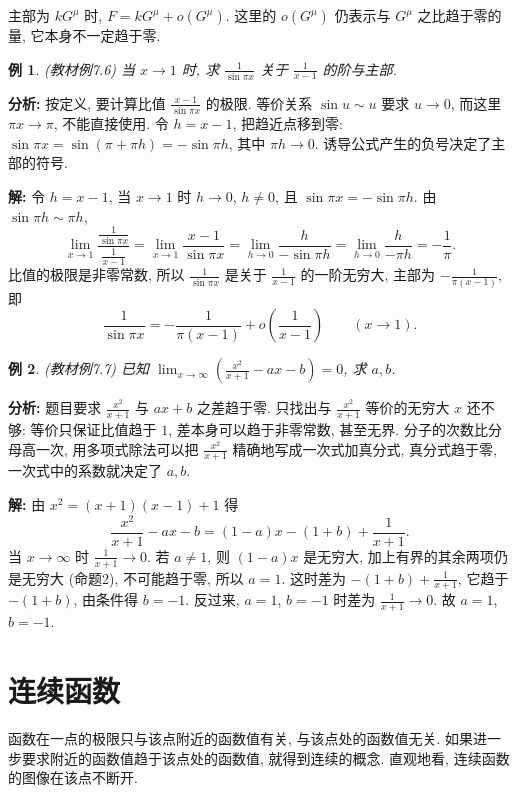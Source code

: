 \documentclass[UTF8,openany]{ctexbook}
\theoremstyle{chinesetextbook}
\newtheorem{example}{例}[section]
\newenvironment{cnsolution}{\par\indent\textbf{解:} \ignorespaces}{\par}
\begin{document}
主部为 $kG^\mu$ 时, $F=kG^\mu+o(G^\mu)$. 这里的 $o(G^\mu)$ 仍表示与 $G^\mu$ 之比趋于零的量, 它本身不一定趋于零.
\begin{example}\label{ex:7-6}
\textnormal{(教材例7.6)} 当 $x\to1$ 时, 求 $\displaystyle\frac1{\sin\pi x}$ 关于 $\displaystyle\frac1{x-1}$ 的阶与主部.
\end{example}
\par\indent\textbf{分析:} 按定义, 要计算比值 $\displaystyle\frac{x-1}{\sin\pi x}$ 的极限. 等价关系 $\sin u\sim u$ 要求 $u\to0$, 而这里 $\pi x\to\pi$, 不能直接使用. 令 $h=x-1$, 把趋近点移到零: $\sin\pi x=\sin(\pi+\pi h)=-\sin\pi h$, 其中 $\pi h\to0$. 诱导公式产生的负号决定了主部的符号.
\begin{cnsolution}
令 $h=x-1$, 当 $x\to1$ 时 $h\to0$, $h\ne0$, 且 $\sin\pi x=-\sin\pi h$. 由 $\sin\pi h\sim\pi h$,
\[
\lim_{x\to1}\frac{\frac1{\sin\pi x}}{\frac1{x-1}}=\lim_{x\to1}\frac{x-1}{\sin\pi x}=\lim_{h\to0}\frac h{-\sin\pi h}=\lim_{h\to0}\frac h{-\pi h}=-\frac1\pi.
\]
比值的极限是非零常数, 所以 $\displaystyle\frac1{\sin\pi x}$ 是关于 $\displaystyle\frac1{x-1}$ 的一阶无穷大, 主部为 $\displaystyle-\frac1{\pi(x-1)}$, 即
\[
\frac1{\sin\pi x}=-\frac1{\pi(x-1)}+o\!\left(\frac1{x-1}\right)\qquad(x\to1).
\]
\end{cnsolution}
\begin{example}
\textnormal{(教材例7.7)} 已知 $\displaystyle\lim_{x\to\infty}\left(\frac{x^2}{x+1}-ax-b\right)=0$, 求 $a,b$.
\end{example}
\par\indent\textbf{分析:} 题目要求 $\displaystyle\frac{x^2}{x+1}$ 与 $ax+b$ 之差趋于零. 只找出与 $\displaystyle\frac{x^2}{x+1}$ 等价的无穷大 $x$ 还不够: 等价只保证比值趋于 $1$, 差本身可以趋于非零常数, 甚至无界. 分子的次数比分母高一次, 用多项式除法可以把 $\displaystyle\frac{x^2}{x+1}$ 精确地写成一次式加真分式, 真分式趋于零, 一次式中的系数就决定了 $a,b$.
\begin{cnsolution}
由 $x^2=(x+1)(x-1)+1$ 得
\[
\frac{x^2}{x+1}-ax-b=(1-a)x-(1+b)+\frac1{x+1}.
\]
当 $x\to\infty$ 时 $\displaystyle\frac1{x+1}\to0$. 若 $a\ne1$, 则 $(1-a)x$ 是无穷大, 加上有界的其余两项仍是无穷大 (命题2), 不可能趋于零, 所以 $a=1$. 这时差为 $\displaystyle-(1+b)+\frac1{x+1}$, 它趋于 $-(1+b)$, 由条件得 $b=-1$. 反过来, $a=1$, $b=-1$ 时差为 $\displaystyle\frac1{x+1}\to0$. 故 $a=1$, $b=-1$.
\end{cnsolution}
\section{连续函数}
函数在一点的极限只与该点附近的函数值有关, 与该点处的函数值无关. 如果进一步要求附近的函数值趋于该点处的函数值, 就得到连续的概念. 直观地看, 连续函数的图像在该点不断开.
\end{document}
